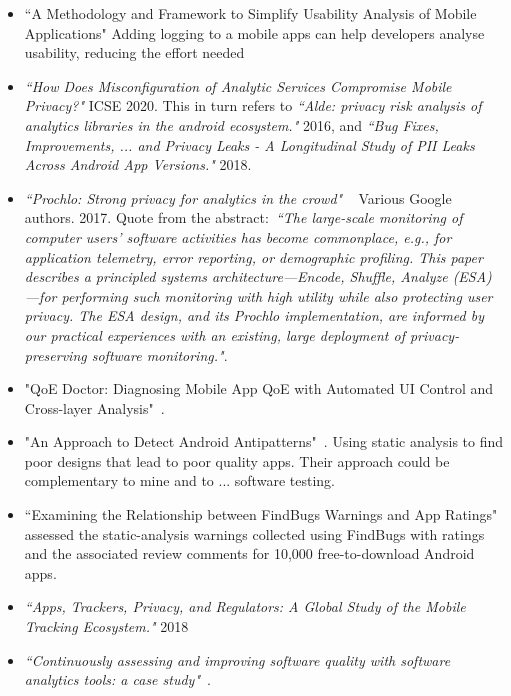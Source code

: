 \begin{itemize}
    \item ``A Methodology and Framework to Simplify Usability Analysis of Mobile Applications" Adding logging to a mobile apps can help developers analyse usability, reducing the effort needed
    
    \item \emph{``How Does Misconfiguration of Analytic Services Compromise Mobile Privacy?"} ICSE 2020. This in turn refers to \emph{``Alde: privacy risk analysis of analytics libraries in the android ecosystem."} 2016, and \emph{``Bug Fixes, Improvements, ... and Privacy Leaks - A Longitudinal Study of PII Leaks Across Android App Versions."} 2018.
    
    \item \emph{``Prochlo: Strong privacy for analytics in the crowd"}  ~\citep{prochlo2017_strong_privacy_analytics_in_the_crowd_46411} Various Google authors. 2017. Quote from the abstract:~\emph{``The large-scale monitoring of computer users' software activities has become commonplace, e.g., for application telemetry, error reporting, or demographic profiling. This paper describes a principled systems architecture---Encode, Shuffle, Analyze (ESA)---for performing such monitoring with high utility while also protecting user privacy. The ESA design, and its Prochlo implementation, are informed by our practical experiences with an existing, large deployment of privacy-preserving software monitoring."}.

    \item "QoE Doctor: Diagnosing Mobile App QoE with Automated UI Control and Cross-layer Analysis"~\cite{chen2014qoe}.
    \item "An Approach to Detect Android Antipatterns"~\cite{hecht2015approach}. Using static analysis to find poor designs that lead to poor quality apps. Their approach could be complementary to mine and to ... software testing.
    \item ``Examining the Relationship between FindBugs Warnings and App Ratings"~\cite{khalid2016_examining_the_relationship_between_findbugs_warnings_and_app_ratings} assessed the static-analysis warnings collected using FindBugs with ratings and the associated review comments for 10,000 free-to-download Android apps.
    
    \item \emph{``Apps, Trackers, Privacy, and Regulators: A Global Study of the Mobile Tracking Ecosystem."} 2018
    
    \item \emph{``Continuously assessing and improving software quality with software analytics tools: a case study"}~\cite{martinez_fernandez2019_continuously_assessing_and_improving_software_quallty_with_software_analytics_tools}.
    

\end{itemize}
